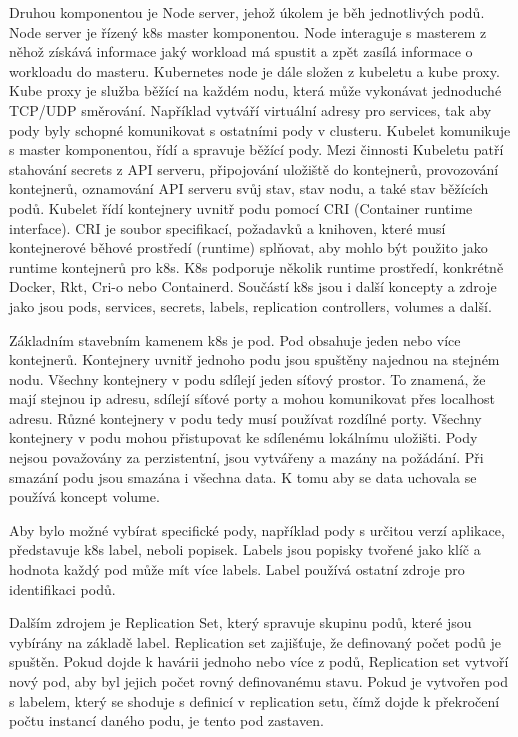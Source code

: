 Druhou komponentou je Node server, jehož úkolem je běh jednotlivých podů. Node server je řízený k8s master komponentou. Node interaguje s masterem z něhož získává informace jaký workload má spustit a zpět zasílá informace o workloadu do masteru. Kubernetes node je dále složen z kubeletu a kube proxy. Kube proxy je služba běžící na každém nodu, která může vykonávat jednoduché TCP/UDP směrování. Například vytváří virtuální adresy pro services, tak aby pody byly schopné komunikovat s ostatními pody v clusteru. Kubelet komunikuje s master komponentou, řídí a spravuje běžící pody. Mezi činnosti Kubeletu patří stahování secrets z API serveru, připojování uložiště do kontejnerů, provozování kontejnerů, oznamování API serveru svůj stav, stav nodu, a také stav běžících podů. Kubelet řídí kontejnery uvnitř podu pomocí CRI (Container runtime interface). CRI je soubor specifikací, požadavků a knihoven, které musí kontejnerové běhové prostředí (runtime) splňovat, aby mohlo být použito jako runtime kontejnerů pro k8s. K8s podporuje několik runtime prostředí, konkrétně Docker, Rkt, Cri-o nebo Containerd. Součástí k8s jsou i další koncepty a zdroje jako jsou pods, services, secrets, labels, replication controllers, volumes a další.   \par
Základním stavebním kamenem k8s je pod. Pod obsahuje jeden nebo více kontejnerů. Kontejnery uvnitř jednoho podu jsou spuštěny najednou na stejném nodu. Všechny kontejnery v podu sdílejí jeden síťový prostor. To znamená, že mají stejnou ip adresu, sdílejí síťové porty a mohou komunikovat přes localhost adresu. Různé kontejnery v podu tedy musí používat rozdílné porty. Všechny kontejnery v podu mohou přistupovat ke sdílenému lokálnímu uložišti. Pody nejsou považovány za perzistentní, jsou vytvářeny a mazány na požádání. Při smazání podu jsou smazána i všechna data. K tomu aby se data uchovala se používá koncept volume.\par
Aby bylo možné vybírat specifické pody, například pody s určitou verzí aplikace, představuje k8s label, neboli popisek. Labels jsou popisky tvořené jako klíč a hodnota každý pod může mít více labels. Label používá ostatní zdroje pro identifikaci podů.\par
Dalším zdrojem je Replication Set, který spravuje skupinu podů, které jsou vybírány na základě label. Replication set zajišťuje, že definovaný počet podů je spuštěn. Pokud dojde k havárii jednoho nebo více z podů, Replication set vytvoří nový pod, aby byl jejich počet rovný definovanému stavu. Pokud je vytvořen pod s labelem, který se shoduje s definicí v replication setu, čímž dojde k překročení počtu instancí daného podu, je tento pod zastaven. \par

